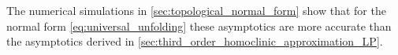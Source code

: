 The numerical simulations in \cref{sec:topological_normal_form} show that for
the normal form \cref{eq:universal_unfolding} these asymptotics are more
accurate than the asymptotics derived in
\cref{sec:third_order_homoclinic_approximation_LP}.

\ifthesis
\else

\fi




